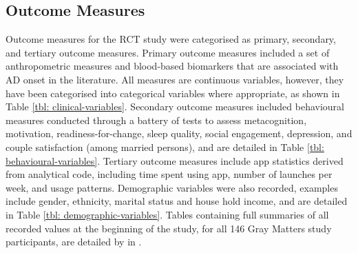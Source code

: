 \subsection{Outcome Measures}
Outcome measures for the RCT study were categorised as primary, secondary, and tertiary outcome measures.
\newline Primary outcome measures included a set of anthropometric measures and blood-based biomarkers that are associated with AD onset in the literature. All measures are continuous variables, however, they have been categorised into categorical variables where appropriate, as shown in Table \ref{tbl: clinical-variables}.
\newline Secondary outcome measures included behavioural measures conducted through a battery of tests to assess metacognition, motivation, readiness-for-change, sleep quality, social engagement, depression, and couple satisfaction (among married persons), and are detailed in Table \ref{tbl: behavioural-variables}.
\newline Tertiary outcome measures include app statistics derived from analytical code, including time spent using app, number of launches per week, and usage patterns. Demographic variables were also recorded, examples include gender, ethnicity, marital status and house hold income, and are detailed in Table \ref{tbl: demographic-variables}.
\newline Tables containing full summaries of all recorded values at the beginning of the study, for all 146 Gray Matters study participants, are detailed by \citeauthor{Norton2015-TRCI} in \cite{Norton2015-TRCI}.

